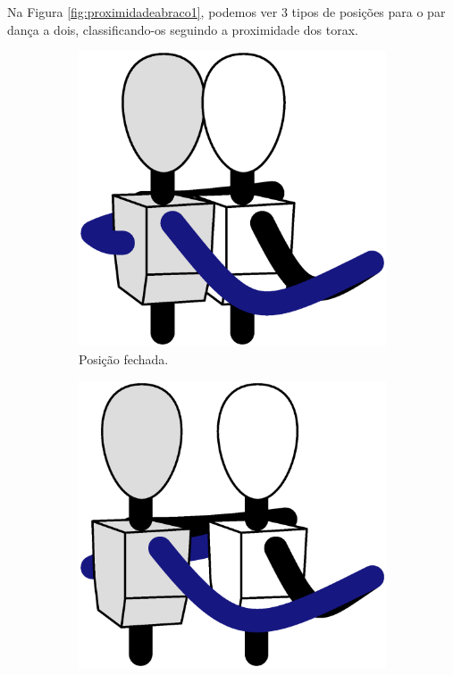 Na Figura \ref{fig:proximidadeabraco1},
podemos ver  3 tipos de posições
para o par dança a dois, 
classificando-os seguindo a proximidade dos torax.
\begin{figure}[!ht]
     \centering
     \begin{subfigure}[b]{0.31\textwidth}
         \centering
         \includegraphics[width=\textwidth]{chapters/cap-normas/position-closed.eps}
         \caption{Posição fechada.}
         \label{fig:proximidadeabraco1:closed}
     \end{subfigure}
     \hfill
     \begin{subfigure}[b]{0.31\textwidth}
         \centering
         \includegraphics[width=\textwidth]{chapters/cap-normas/position-open.eps}

\end{subfigure}
\end{figure}
